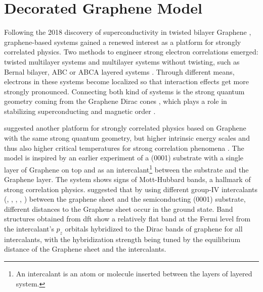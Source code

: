 \documentclass[../notes.tex]{subfiles}
\begin{document}
\raggedbottom

\chapter{Decorated Graphene Model}\label{ch:decorated graphene model}

Following the 2018 discovery of superconductivity in twisted bilayer Graphene \cite{caoUnconventionalSuperconductivityMagicangle2018}, graphene-based systems gained a renewed interest as a platform for strongly correlated physics.
Two methods to engineer strong electron correlations emerged: twisted multilayer systems  \cite{caoUnconventionalSuperconductivityMagicangle2018, tanakaSuperfluidStiffnessMagicangle2025, tormaSuperconductivitySuperfluidityQuantum2022, andreiGrapheneBilayersTwist2020, xieTopologyBoundedSuperfluidWeight2020} and multilayer systems without twisting, such as Bernal bilayer, ABC or ABCA layered systems \cite{pantaleonSuperconductivityCorrelatedPhases2023}.
Through different means, electrons in these systems become localized so that interaction effects get more strongly pronounced.
Connecting both kind of systems is the strong quantum geometry coming from the Graphene Dirac cones \cite{wehlingDiracMaterials2014}, which plays a role in stabilizing superconducting \cite{liangBandGeometryBerry2017, tanakaSuperfluidStiffnessMagicangle2025} and magnetic order \cite{abouelkomsanQuantumMetricInduced2023, liuOrbitalMagneticStates2021}.

\citeauthor{wittQuantumGeometryLocal2025} suggested another platform for strongly correlated physics based on Graphene with the same strong quantum geometry, but higher intrinsic energy scales and thus also higher critical temperatures for strong correlation phenomena \cite{wittQuantumGeometryLocal2025}.
The model is inspired by an earlier experiment \cite{ghosalElectronicCorrelationsEpitaxial2024} of a (0001) substrate with a single layer of Graphene on top and  as an intercalant\footnote{An intercalant is an atom or molecule inserted between the layers of layered system.} between the substrate and the Graphene layer.
The system shows signs of Mott-Hubbard bands, a hallmark of strong correlation physics.
\citeauthor{wittQuantumGeometryLocal2025} suggested that by using different group-IV intercalants (, , , , ) between the graphene sheet and the semiconducting (0001) substrate, different distances to the Graphene sheet occur in the ground state.
Band structures obtained from \acrfull{dft} show a relatively flat band at the Fermi level from the intercalant’s \(p_z\) orbitals hybridized to the Dirac bands of graphene for all intercalants, with the hybridization strength being tuned by the equilibrium distance of the Graphene sheet and the intercalants.
\end{document}
